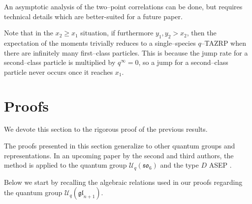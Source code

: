 \documentclass{ximera}
\begin{document}
\begin{remark}
An asymptotic analysis of  the two--point correlations can be done, but requires technical details which are better-suited for a future paper. 
\end{remark}

\begin{remark}\label{remark:1}
 Note that in the $x_2\geq x_1$ situation, if furthermore $y_1,y_2>x_2$, then the expectation of the moments trivially reduces to a single--species $q$--TAZRP when there are infinitely many first--class particles. This is because the jump rate for a second--class particle is multiplied by $q^{\infty}=0$, so a jump for a second--class particle never occurs once it reaches $x_1$.
\end{remark}

\section{Proofs}\label{Pfs}
We devote this section to the rigorous proof of the previous results. 

\begin{remark}\label{REURem}

The proofs presented in this section generalize to other quantum groups and representations. In an upcoming paper by the second and third authors, the method is applied to the quantum group $\mathcal{U}_q(\mathfrak{so}_6)$ and the type $D$ ASEP \cite{REU2022}. 
\end{remark}
\noindent

Below we start by recalling the algebraic relations used in our proofs regarding the quantum group $\mathcal{U}_q(\mathfrak{gl}_{n+1})$. 
\end{document}
